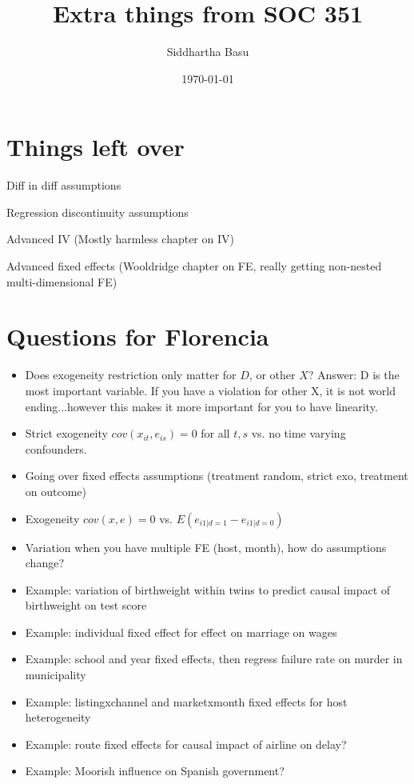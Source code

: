 \documentclass[12 pt, leqno]{article}
\begin{document}
\title{Extra things from SOC 351}
\author{Siddhartha Basu}
\date{\today}
\maketitle


\section{Things left over}

Diff in diff assumptions

Regression discontinuity assumptions

Advanced IV (Mostly harmless chapter on IV)

Advanced fixed effects (Wooldridge chapter on FE, really getting non-nested multi-dimensional FE)




\section{Questions for Florencia}
\begin{itemize}
\item Does exogeneity restriction only matter for $D$, or other $X$? Answer: D is the most important variable. If you have a violation for other X, it is not world ending...however this makes it more important for you to have linearity. 
\item Strict exogeneity $cov(x_{it}, e_{is}) = 0$ for all $t, s$ vs. no time varying confounders. 
\item Going over fixed effects assumptions (treatment random, strict exo, treatment on outcome)
\item Exogeneity $cov(x,e) = 0$ vs. $E(e_{i1|d=1} - e_{i1|d = 0})$
\item Variation when you have multiple FE (host, month), how do assumptions change?
\item Example: variation of birthweight within twins to predict causal impact of birthweight on test score
\item Example: individual fixed effect for effect on marriage on wages
\item Example: school and year fixed effects, then regress failure rate on murder in municipality
\item Example: listingxchannel and marketxmonth fixed effects for host heterogeneity
\item Example: route fixed effects for causal impact of airline on delay?
\item Example: Moorish influence on Spanish government?
\end{itemize}
\end{document}
